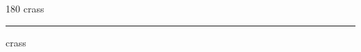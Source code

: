 
\begin{frame}
\begin{center}
\begin{turn}{180}
{\fontsize{2.5cm}{1em}\selectfont crass}
\end{turn}
\vspace{1em}\par  
\hrule
\vspace{1em}\par  
{\fontsize{2.5cm}{1em}\selectfont crass}
\end{center}
\end{frame}
